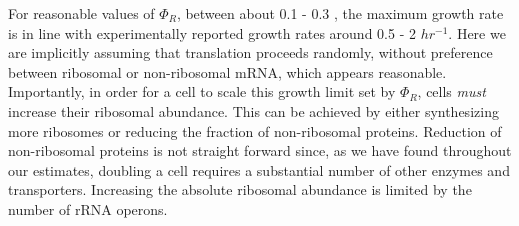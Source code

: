 For reasonable values of $\Phi_R$, between about 0.1 - 0.3 \citep{scott2010},
the maximum growth rate is in line with experimentally reported growth rates
around 0.5 - 2 $hr^{-1}$. Here we are implicitly assuming that translation
proceeds randomly, without preference between ribosomal or non-ribosomal mRNA,
which appears reasonable. Importantly, in order for a cell to scale this growth
limit set by $\Phi_R$, cells \textit{must} increase their ribosomal abundance.
This can be achieved by either synthesizing more ribosomes or reducing the
fraction of non-ribosomal proteins. Reduction of non-ribosomal proteins is not
straight forward since, as we have found throughout our estimates, doubling a
cell requires a substantial number of other enzymes and transporters. Increasing
the absolute ribosomal abundance is limited by the number of rRNA operons.

